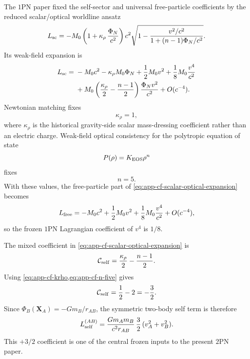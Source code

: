 \documentclass[11pt]{article}
\newcommand{\OnePN}{\mathrm{1PN}}
\newcommand{\TwoPN}{\mathrm{2PN}}
\newcommand{\krho}{\kappa_{\rho}}
\begin{document}
The \(\OnePN\) paper fixed the self-sector and universal free-particle coefficients by the
reduced scalar/optical worldline ansatz
\begin{equation}
L_{\rm sc}
=
-M_0\left(1+\krho\,\frac{\Phi_N}{c^2}\right)c^2
\sqrt{1-
\frac{v^2/c^2}{1+(n-1)\Phi_N/c^2}}.
\label{eq:app-cf-scalar-optical-ansatz}
\end{equation}
Its weak-field expansion is
\begin{align}
L_{\rm sc}
={}&-M_0c^2-\krho M_0\Phi_N+\frac12M_0v^2+\frac18M_0\frac{v^4}{c^2}
\nonumber\\
&+M_0\left(\frac{\krho}{2}-\frac{n-1}{2}\right)\frac{\Phi_N v^2}{c^2}+O(c^{-4}).
\label{eq:app-cf-scalar-optical-expansion}
\end{align}
Newtonian matching fixes
\begin{equation}
\kappa_\rho=1,
\label{eq:app-cf-krho}
\end{equation}
where \(\krho\) is the historical gravity-side scalar mass-dressing coefficient
rather than an electric charge.
Weak-field optical consistency for the polytropic equation of state
\begin{equation}
P(\rho)=K_{\rm EOS}\rho^n
\label{eq:app-cf-polytrope}
\end{equation}
fixes
\begin{equation}
n=5.
\label{eq:app-cf-n-five}
\end{equation}
With these values, the free-particle part of
\cref{eq:app-cf-scalar-optical-expansion} becomes
\begin{equation}
L_{\rm free}
=
-M_0c^2+\frac12M_0v^2+\frac18M_0\frac{v^4}{c^2}+O(c^{-4}),
\label{eq:app-cf-free-quartic}
\end{equation}
so the frozen \(\OnePN\) Lagrangian coefficient of \(v^4\) is \(1/8\).

The mixed coefficient in \cref{eq:app-cf-scalar-optical-expansion} is
\begin{equation}
\mathcal C_{\rm self}=\frac{\krho}{2}-\frac{n-1}{2}.
\label{eq:app-cf-Cself-def}
\end{equation}
Using \cref{eq:app-cf-krho,eq:app-cf-n-five} gives
\begin{equation}
\mathcal C_{\rm self}=\frac12-2=-\frac32.
\label{eq:app-cf-Cself-value}
\end{equation}
Since \(\Phi_B(\mathbf X_A)=-Gm_B/r_{AB}\), the symmetric two-body self term is therefore
\begin{equation}
L_{\rm self}^{(AB)}
=
\frac{Gm_A m_B}{c^2r_{AB}}\,\frac32\,(v_A^2+v_B^2).
\label{eq:app-cf-self-pair-term}
\end{equation}
This \(+3/2\) coefficient is one of the central frozen inputs to the present \(\TwoPN\)
paper.
\end{document}
